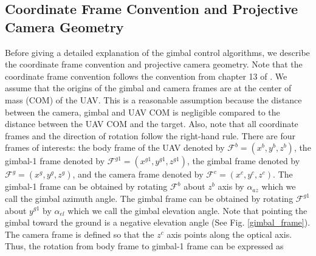 \subsection{Coordinate Frame Convention and Projective Camera Geometry}
Before giving a detailed explanation of the gimbal control algorithms, we describe the coordinate frame convention and projective camera geometry. Note that the coordinate frame convention follows the convention from chapter 13 of \cite{beard2012small}. We assume that the origins of the gimbal and camera frames are at the center of mass (COM) of the UAV. This is a reasonable assumption because the distance between the camera, gimbal and UAV COM is negligible compared to the distance between the UAV COM and the target. Also, note that all coordinate frames and the direction of rotation follow the right-hand rule. There are four frames of interests: the body frame of the UAV denoted by $\mathcal{F}^b=(x^{b}, y^{b}, z^{b})$, the gimbal-1 frame denoted by $\mathcal{F}^{g1}=(x^{g1}, y^{g1}, z^{g1})$, the gimbal frame denoted by $\mathcal{F}^{g}=(x^{g}, y^{g}, z^{g})$, and the camera frame denoted by $\mathcal{F}^{c}=(x^{c}, y^{c}, z^{c})$. The gimbal-1 frame can be obtained by rotating $\mathcal{F}^b$ about $z^{b}$ axis by $\alpha_{az}$ which we call the gimbal azimuth angle. The gimbal frame can be obtained by rotating $\mathcal{F}^{g1}$ about $y^{g1}$ by $\alpha_{el}$ which we call the gimbal elevation angle. Note that pointing the gimbal toward the ground is a negative elevation angle (See Fig. \ref{gimbal_frame}). The camera frame is defined so that the $z^{c}$ axis points along the optical axis. Thus, the rotation from body frame to gimbal-1 frame can be expressed as

